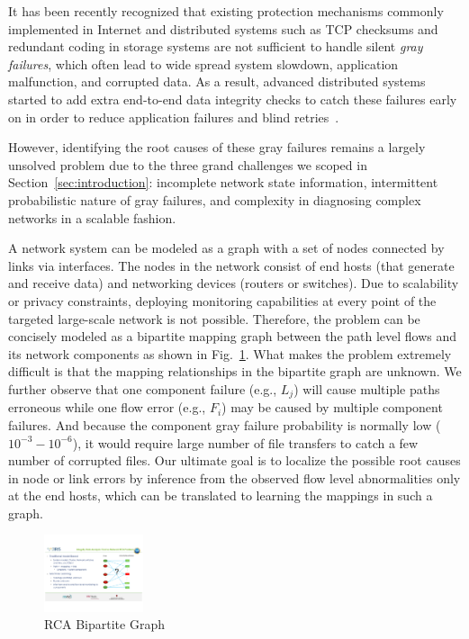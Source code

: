 It has been recently recognized that existing protection mechanisms commonly implemented in Internet and distributed systems such as TCP checksums and redundant coding in storage systems are not sufficient to handle silent {\it gray failures}, which often lead to wide spread system slowdown, application malfunction, and corrupted data. As a result, advanced distributed systems started to add extra end-to-end data integrity checks to catch these failures early on in order to reduce application failures and blind retries~\cite{swip:pearc:2019}. 

However, identifying the root causes of these gray failures remains a largely unsolved problem due to the three grand challenges we scoped in Section~\ref{sec:introduction}: 
incomplete network state information, intermittent probabilistic nature of gray failures, and complexity in diagnosing complex networks in a scalable fashion.  

A network system can be modeled as a graph with a set of nodes connected by links via interfaces. The nodes in the network consist of end hosts (that generate and receive data) and networking devices (routers or switches). Due to scalability or privacy constraints, deploying monitoring capabilities at every point of the targeted large-scale network is not possible. Therefore, the problem can be concisely modeled as a bipartite mapping graph between the path level flows and its network components as shown in Fig.~\ref{fig:bipartite}. What makes the problem extremely difficult is that the mapping relationships in the bipartite graph are unknown. We further observe that one component failure (e.g., $L_j$) will cause multiple paths erroneous while one flow error (e.g., $F_i$) may be caused by multiple component failures. And because the component gray failure probability is normally low ($10^{-3} - 10^{-6}$), it would require large number of file transfers to catch a few number of corrupted files. Our ultimate goal is to localize the possible root causes in node or link errors by inference from the observed flow level abnormalities only at the end hosts, which can be translated to learning the mappings in such a graph.

\begin{figure}
\vspace{-10pt}
  \begin{center}
    \includegraphics[width=0.26\textwidth]{./figure/RCABipartite}
  \end{center}
  \vspace{-5pt}
\caption{RCA Bipartite Graph}
\vspace{-5pt}
\label{fig:bipartite}
\end{figure}

